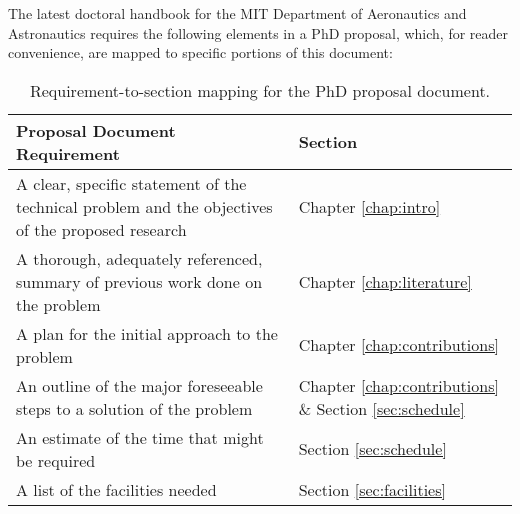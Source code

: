 The latest doctoral handbook for the MIT Department of Aeronautics and Astronautics \cite{mit_aa_doctoral_handbook} requires the following elements in a PhD proposal, which, for reader convenience, are mapped to specific portions of this document:

\begingroup
\renewcommand{\arraystretch}{1.8} %
\begin{table}[H]
    \centering
    \caption{Requirement-to-section mapping for the PhD proposal document.}
    \label{tab:toc}
    \begin{tabular}{m{10cm} m{4cm}}
        \toprule
        \textbf{Proposal Document Requirement}                                                           & \textbf{Section}                                               \\
        \midrule
        A clear, specific statement of the technical problem and the objectives of the proposed research & Chapter \ref{chap:intro} \\
        A thorough, adequately referenced, summary of previous work done on the problem                  & Chapter \ref{chap:literature}                                  \\
        A plan for the initial approach to the problem                                                   & Chapter \ref{chap:contributions}                               \\
        An outline of the major foreseeable steps to a solution of the problem                           & Chapter \ref{chap:contributions} \& Section \ref{sec:schedule} \\
        An estimate of the time that might be required                                                   & Section \ref{sec:schedule}                                     \\
        A list of the facilities needed                                                                  & Section \ref{sec:facilities}                                   \\
        \bottomrule
    \end{tabular}
\end{table}
\endgroup

